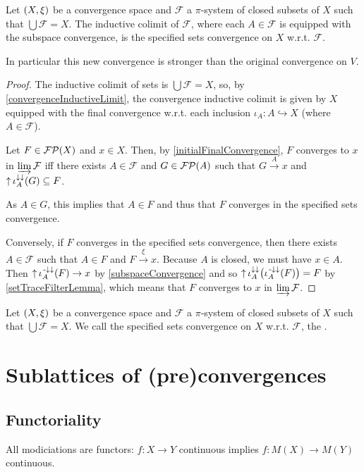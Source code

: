 \begin{proposition}
Let $\sSet{X,\xi}$ be a convergence space and $\mathcal{F}$ a $\pi$-system of closed subsets of $X$ such that $\bigcup \mathcal{F} = X$. The inductive colimit of $\mathcal{F}$, where each $A\in \mathcal{F}$ is equipped with the subspace convergence, is the specified sets convergence on $X$ w.r.t. $\mathcal{F}$.
\end{proposition}
In particular this new convergence is stronger than the original convergence on $V$.
\begin{proof}
The inductive colimit of sets is $\bigcup \mathcal{F} = X$, so, by \ref{convergenceInductiveLimit}, the convergence inductive colimit is given by $X$ equipped with the final convergence w.r.t. each inclusion $\iota_A: A\hookrightarrow X$ (where $A\in \mathcal{F}$).

Let $F\in\operatorname{\mathcal{FP}}(X)$ and $x\in X$. Then, by \ref{initialFinalConvergence}, $F$ converges to $x$ in $\varinjlim \mathcal{F}$ iff there exists $A\in \mathcal{F}$ and $G \in \operatorname{\mathcal{FP}}(A)$ such that $G\overset{A}{\longrightarrow} x$ and $\operatorname{\uparrow}\iota_A^{\downarrow\downarrow}(G) \subseteq F$.

As $A\in G$, this implies that $A\in F$ and thus that $F$ converges in the specified sets convergence.

Conversely, if $F$ converges in the specified sets convergence, then there exists $A\in \mathcal{F}$ such that $A \in F$ and $F\overset{\xi}{\longrightarrow} x$. Because $A$ is closed, we must have $x\in A$. Then $\operatorname{\uparrow}\iota_A^{{\text{\hspace{0.15em}-}\downarrow}\downarrow}(F) \to x$ by \ref{subspaceConvergence} and so $\operatorname{\uparrow}\iota_A^{\downarrow\downarrow}\big(\iota_A^{{\text{\hspace{0.15em}-}\downarrow}\downarrow}(F)\big) = F$ by \ref{setTraceFilterLemma}, which means that $F$ converges to $x$ in $\varinjlim \mathcal{F}$.
\end{proof}

\begin{definition}
Let $\sSet{X,\xi}$ be a convergence space and $\mathcal{F}$ a $\pi$-system of closed subsets of $X$ such that $\bigcup \mathcal{F} = X$. We call the specified sets convergence on $X$ w.r.t. $\mathcal{F}$, the .
\end{definition}

\section{Sublattices of (pre)convergences}
\subsection{Functoriality}
\begin{proposition} \label{convergenceModificationFunctoriality}
All modiciations are functors: $f:X\to Y$ continuous implies $f: M(X)\to M(Y)$ continuous.
\end{proposition}

